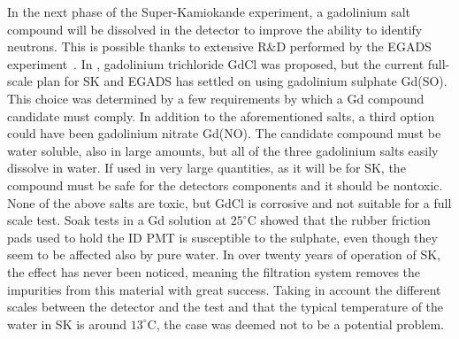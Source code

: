 In the next phase of the Super-Kamiokande experiment, a gadolinium salt compound %
will be dissolved in the detector to improve the ability to identify neutrons.
This is possible thanks to extensive R\&D performed by the EGADS experiment~\cite{Ikeda:2019pcm}.
In , gadolinium trichloride GdCl was proposed, %
but the current full-scale plan for SK and EGADS has settled on using gadolinium sulphate Gd(SO).
This choice was determined by a few requirements by which a Gd compound candidate must comply.
In addition to the aforementioned salts, a third option could have been gadolinium nitrate Gd(NO).
The candidate compound must be water soluble, also in large amounts, but all of the three gadolinium salts %
easily dissolve in water.
If used in very large quantities, as it will be for SK, the compound must be safe for %
the detectors components and it should be nontoxic. %
None of the above salts are toxic, but GdCl is corrosive and not suitable for a full scale test.
Soak tests in a Gd solution at $25^\circ$C showed that the rubber friction pads used to hold the ID PMT %
is susceptible to the sulphate, even though they seem to be affected also by pure water.
In over twenty years of operation of SK, the effect has never been noticed, meaning the filtration system %
removes the impurities from this material with great success.
Taking in account the different scales between the detector and the test and that the typical temperature %
of the water in SK is around $13^\circ$C, the case was deemed not to be a potential problem.
